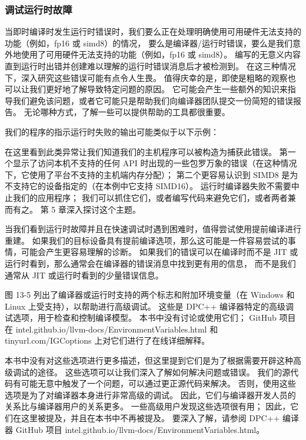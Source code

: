 \subsubsection{调试运行时故障}
当即时编译时发生运行时错误时，我们要么正在处理明确使用可用硬件无法支持的功能（例如，fp16 或 simd8）的情况，
要么是编译器/运行时错误，要么是我们意外地使用了可用硬件无法支持的功能（例如，fp16 或 simd8）。 
编写的无意义内容直到运行时出错并创建难以理解的运行时错误消息后才被检测到。 
在这三种情况下，深入研究这些错误可能有点令人生畏。 
值得庆幸的是，即使是粗略的观察也可以让我们更好地了解导致特定问题的原因。 
它可能会产生一些额外的知识来指导我们避免该问题，或者它可能只是帮助我们向编译器团队提交一份简短的错误报告。 
无论哪种方式，了解一些可以提供帮助的工具都很重要。

我们的程序的指示运行时失败的输出可能类似于以下示例：

在这里看到此类异常让我们知道我们的主机程序可以被构造为捕获此错误。 
第一个显示了访问本机不支持的任何 API 时出现的一些包罗万象的错误（在这种情况下，它使用了平台不支持的主机端内存分配）； 
第二个更容易认识到 SIMD8 是为不支持它的设备指定的（在本例中它支持 SIMD16）。 
运行时编译器失败不需要中止我们的应用程序； 我们可以抓住它们，或者编写代码来避免它们，或者两者兼而有之。 
第 5 章深入探讨这个主题。

当我们看到运行时故障并且在快速调试时遇到困难时，值得尝试使用提前编译进行重建。 
如果我们的目标设备具有提前编译选项，那么这可能是一件容易尝试的事情，可能会产生更容易理解的诊断。 
如果我们的错误可以在编译时而不是 JIT 或运行时看到，那么通常会在编译器的错误消息中找到更有用的信息，
而不是我们通常从 JIT 或运行时看到的少量错误信息。

图 13-5 列出了编译器或运行时支持的两个标志和附加环境变量（在 Windows 和 Linux 上受支持），以帮助进行高级调试。 
这些是 DPC++ 编译器特定的高级调试选项，用于检查和控制编译模型。 
本书中没有讨论或使用它们； 
GitHub 项目在 intel.github.io/llvm-docs/EnvironmentVariables.html 
和tinyurl.com/IGCoptions 上对它们进行了在线详细解释。

本书中没有对这些选项进行更多描述，但这里提到它们是为了根据需要开辟这种高级调试的途径。 
这些选项可以让我们深入了解如何解决问题或错误。 我们的源代码有可能无意中触发了一个问题，可以通过更正源代码来解决。 
否则，使用这些选项是为了对编译器本身进行非常高级的调试。 
因此，它们与编译器开发人员的关系比与编译器用户的关系更多。 
一些高级用户发现这些选项很有用； 因此，它们在这里被提及，并且在本书中不再被提及。 
要深入了解，请参阅 DPC++ 编译器 GitHub 项目 intel.github.io/llvm-docs/EnvironmentVariables.html。

